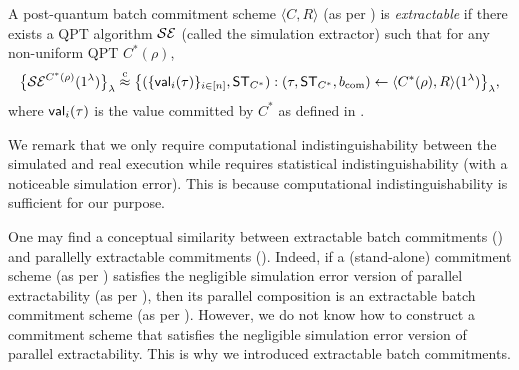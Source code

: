 \begin{definition}[PQ-ExtBCom]\label{def:sim-ext-bcom:strong}
A post-quantum batch commitment scheme $\langle C, R\rangle$ (as per ) is {\em extractable} if there exists a QPT algorithm $\mathcal{SE}$ (called the simulation extractor) such that for any non-uniform QPT $C^*(\rho)$, 
\begin{equation*}
\big\{ \mathcal{SE}^{C^*(\rho)}(1^\lambda) \big\}_\lambda
\stackrel{\text{c}}{\approx} 
\big\{(\{\mathsf{val}_i(\tau)\}_{i\in [n]}, \mathsf{ST}_{C^*}):(\tau,\mathsf{ST}_{C^*},b_{\mathrm{com}}) \gets \langle C^*(\rho), R \rangle(1^\lambda)\big\}_\lambda,  
\end{equation*}
where $\mathsf{val}_i(\tau)$ is the value committed by $C^*$ as defined in . 
\end{definition}
\begin{remark}\label{rem:comp_vs_stat_ind}
 We remark that we only require computational indistinguishability between the simulated and real execution while  requires statistical indistinguishability (with a noticeable simulation error). This is because computational indistinguishability is sufficient for our purpose.   
\end{remark}
\begin{remark} 
One may find a conceptual similarity between 
extractable batch commitments () and
parallelly extractable commitments (). 
Indeed, if a (stand-alone) commitment scheme (as per ) satisfies the negligible simulation error version of parallel extractability (as per ), then its parallel composition is an extractable batch commitment scheme  (as per ). However, we do not know how to construct a commitment scheme that satisfies the negligible simulation error version of parallel extractability. This is why we introduced extractable batch commitments.   
\end{remark}

